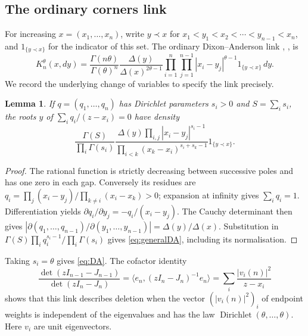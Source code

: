 \documentclass[10pt]{amsart}
\newtheorem{lemma}[theorem]{Lemma}
\DeclareMathOperator{\Dir}{Dirichlet}
\begin{document}
\subsection{The ordinary corners link}
For increasing $x=(x_1,\ldots,x_n)$, write $y\prec x$ for
$x_1<y_1<x_2<\cdots<y_{n-1}<x_n$, and $1_{\{y\prec x\}}$ for the
indicator of this set. The ordinary
Dixon--Anderson link \cite{Anderson}, \cite[Proposition~4.2.1]{Forrester},
\cite[Lemma~1.1]{KS} is
\begin{equation}\label{eq:DA}
 K_n^\theta(x,dy)=\frac{\Gamma(n\theta)}{\Gamma(\theta)^n}
 \frac{\Delta(y)}{\Delta(x)^{2\theta-1}}
 \prod_{i=1}^n\prod_{j=1}^{n-1}|x_i-y_j|^{\theta-1}
 1_{\{y\prec x\}}\,dy.
\end{equation}
We record the underlying change of variables to specify the link precisely.
\begin{lemma}\label{lem:residues}
If $q=(q_1,\ldots,q_n)$ has Dirichlet parameters $s_i>0$ and
$S=\sum_i s_i$, the roots $y$ of $\sum_i q_i/(z-x_i)=0$ have density
\begin{equation}\label{eq:generalDA}
 \frac{\Gamma(S)}{\prod_i\Gamma(s_i)}
 \frac{\Delta(y)\prod_{i,j}|x_i-y_j|^{s_i-1}}
 {\prod_{i<k}(x_k-x_i)^{s_i+s_k-1}}
 1_{\{y\prec x\}}.
\end{equation}
\end{lemma}
\begin{proof}
The rational function is strictly decreasing between successive poles
and has one zero in each gap. Conversely its residues are
$q_i=\prod_j(x_i-y_j)/\prod_{k\ne i}(x_i-x_k)>0$; expansion at
infinity gives $\sum_i q_i=1$. Differentiation yields
$\partial q_i/\partial y_j=-q_i/(x_i-y_j)$. The Cauchy determinant
then gives
$|\partial(q_1,\ldots,q_{n-1})/\partial(y_1,\ldots,y_{n-1})|
=\Delta(y)/\Delta(x)$. Substitution in
$\Gamma(S)\prod_iq_i^{s_i-1}/\prod_i\Gamma(s_i)$ gives
\eqref{eq:generalDA}, including its normalisation.
\end{proof}
Taking $s_i=\theta$ gives \eqref{eq:DA}. The cofactor identity
\[
 \frac{\det(zI_{n-1}-J_{n-1})}{\det(zI_n-J_n)}
 =\langle e_n,(zI_n-J_n)^{-1}e_n\rangle
 =\sum_i\frac{|v_i(n)|^2}{z-x_i}
\]
shows that this link describes deletion when the vector
$(|v_i(n)|^2)_i$ of endpoint weights is independent of the
eigenvalues and has the law $\Dir(\theta,\ldots,\theta)$. Here $v_i$
are unit eigenvectors.
\end{document}
